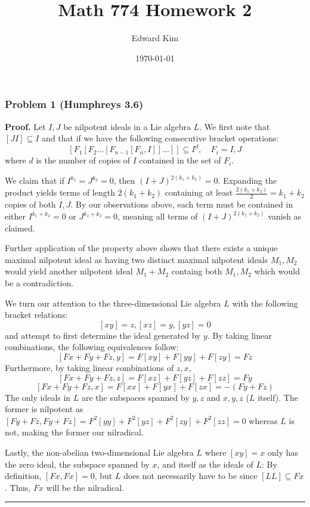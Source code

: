 \documentclass[12pt]{article}%
\newenvironment{proof}[1][Proof]{\textbf{#1.} }{\ \rule{0.5em}{0.5em}}
\begin{document}
\title{Math 774 Homework 2}
\author{Edward Kim}
\date{\today}
\maketitle

\subsubsection*{Problem 1 (Humphreys 3.6)}
\begin{proof}
  Let $I,J$ be nilpotent ideals in a Lie algebra $L$. We first note that $[JI] \subseteq I$ and that if we have the following consecutive bracket operations:
  $$ [F_1 [F_2 ... [F_{n-1}[F_n,I]]...]] \subseteq I^{d}, \quad F_i = I,J $$ where $d$ is the number of copies of $I$ contained  in the set of $F_i$. \newline

  We claim that if $I^{k_1} = J^{k_2} = 0$, then $(I + J)^{2(k_1 + k_2)} = 0$. Expanding the product yields terms of length $2(k_1+k_2)$ containing at least $\frac{2(k_1 + k_2)}{2} = k_1 + k_2$ copies of both $I,J$. By our observations above, each term must be contained in either $I^{k_1 + k_2} = 0$ or $J^{k_1 + k_2} = 0$, meaning all terms of $(I+J)^{2(k_1 + k_2)}$ vanish as claimed. \newline

  Further application of the property above shows that there exists a unique maximal nilpotent ideal as having two distinct maximal nilpotent ideals $M_1,M_2$ would yield another nilpotent ideal $M_1 + M_2$ containg both $M_1,M_2$ which would be a contradiction. \newline

  We turn our attention to the three-dimensional Lie algebra $L$ with the following bracket relations:
  $$ [xy] = z, [xz] = y, [yz] = 0 $$ and attempt to first determine the ideal generated by $y$. By taking linear combinations, the following equivalences follow:
  $$ [Fx + Fy + Fz, y] = F[xy] + F[yy] + F[zy] = Fz $$ Furthermore, by taking linear combinations of $z,x$,
  $$ [Fx + Fy + Fz, z] = F[xz] + F[yz] + F[zz] = Fy $$
  $$ [Fx + Fy + Fz, x] = F[xx] + F[yx] + F[zx] = -(Fy + Fz)$$
  The only ideals in $L$ are the subspaces spanned by $y,z$ and $x,y,z$ ($L$ itself). The former is nilpotent as $[Fy+Fz,Fy+Fz] = F^2[yy] + F^2[yz] + F^2[zy] + F^2[zz] = 0$ whereas $L$ is not, making the former our nilradical.

  Lastly, the non-abelian two-dimensional Lie algebra $L$ where $[xy] = x$ only has the zero ideal, the subspace spanned by $x$, and itself as the ideals of $L$:
  By definition, $[Fx,Fx] = 0$, but $L$ does not necessarily have to be since $[LL] \subseteq Fx$. Thus, $Fx$ will be the nilradical.
\end{proof}
\end{document}
